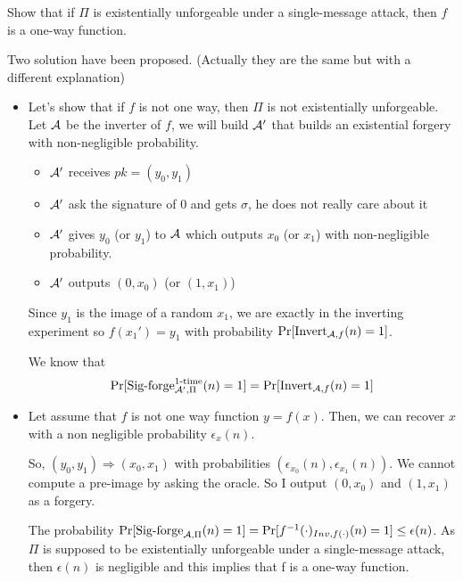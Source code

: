 Show that if $\Pi$ is existentially unforgeable under a single-message
attack, then $f$ is a one-way function.
\begin{solution}
  Two solution have been proposed. (Actually they are the same but with a different explanation)
  \begin{itemize}
    \item
      Let's show that if $f$ is not one way, then $\Pi$ is not existentially unforgeable.
      Let $\mathcal{A}$ be the inverter of $f$, we will build $\mathcal{A}'$ that builds an existential forgery with non-negligible probability.

      \begin{itemize}
        \item $\mathcal{A}'$ receives $pk = (y_0, y_1)$
        \item $\mathcal{A}'$ ask the signature of 0 and gets $\sigma$, he does not really care about it
        \item $\mathcal{A}'$ gives $y_0$ (or $y_1$) to $\mathcal{A}$ which outputs $x_0$ (or $x_1$) with non-negligible probability.
        \item $\mathcal{A}'$ outputs $(0,x_0)$ (or $(1, x_1)$)
      \end{itemize}
      Since $y_1$ is the image of a random $x_1$, we are exactly in the inverting experiment so $f(x_1') = y_1$
      with probability $\Pr[\operatorname{Invert}_{\mathcal{A},f}(n) = 1]$.

      We know that
      \[
        \Pr[\operatorname{Sig-forge}^{\text{1-time}}_{\mathcal{A}',\Pi}(n) = 1] = \Pr[\operatorname{Invert}_{\mathcal{A},f}(n) = 1]
      \]
    \item
      Let assume that $f$ is not one way function $y = f(x)$.
      Then, we can recover $x$ with a non negligible probability $\epsilon_x (n)$.

      So, $(y_0, y_1) \Rightarrow (x_0, x_1)$ with probabilities $(\epsilon_{x_0} (n), \epsilon_{x_1} (n))$.
      We cannot compute a pre-image by asking the oracle. So I output $(0, x_0)$ and $(1, x_1)$ as a forgery.

      The probability $\Pr[\operatorname{Sig-forge}_{\mathcal{A},\Pi}(n)=1]= \Pr[f^{-1}(\cdot)_{Inv,f(\cdot)}(n)=1] \leq \epsilon(n)$. As $\Pi$ is supposed to be existentially unforgeable under a single-message attack, then $\epsilon(n)$ is negligible and this implies that f is a one-way function.
  \end{itemize}
\end{solution}